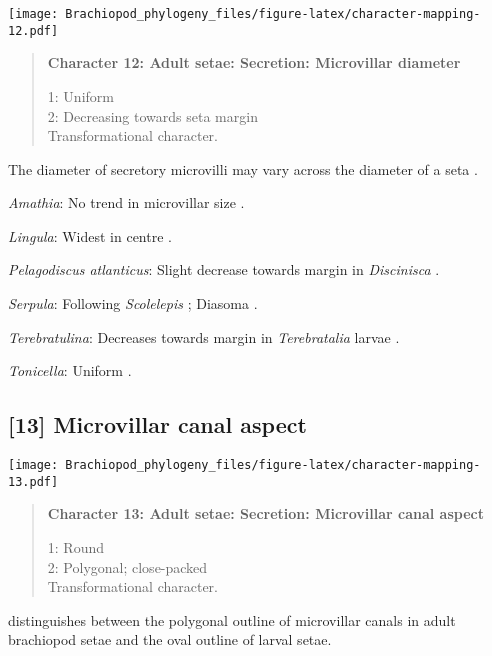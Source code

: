 \documentclass[openany]{book}
\theoremstyle{definition}
\theoremstyle{definition}
\theoremstyle{definition}
\theoremstyle{remark}
\begin{document}
\texttt{[image: Brachiopod\_phylogeny\_files/figure-latex/character-mapping-12.pdf]}

\begin{quote}
\textbf{Character 12: Adult setae: Secretion: Microvillar diameter}

1: Uniform\\
2: Decreasing towards seta margin\\
Transformational character.
\end{quote}

The diameter of secretory microvilli may vary across the diameter of a
seta \citep{Smith2014}.

\hypertarget{Amathia-coding-12}{}
\emph{Amathia}: No trend in microvillar size \citep{Gordon1975}.

\hypertarget{Lingula-coding-12}{}
\emph{Lingula}: Widest in centre \citep{Luter2000}.

\hypertarget{Pelagodiscus_atlanticus-coding-12}{}
\emph{Pelagodiscus atlanticus}: Slight decrease towards margin in
\emph{Discinisca} \citep{Luter2003}.

\hypertarget{Serpula-coding-12}{}
\emph{Serpula}: Following \emph{Scolelepis} \citep{Hausen2005}; Diasoma
\citep{Orrhage1971}.

\hypertarget{Terebratulina-coding-12}{}
\emph{Terebratulina}: Decreases towards margin in \emph{Terebratalia}
larvae \citep{Gustus1972}.

\hypertarget{Tonicella-coding-12}{}
\emph{Tonicella}: Uniform \citep{Fischer1980, Leise1982}.

\subsection*{{[}13{]} Microvillar canal
aspect}\label{microvillar-canal-aspect}

\texttt{[image: Brachiopod\_phylogeny\_files/figure-latex/character-mapping-13.pdf]}

\begin{quote}
\textbf{Character 13: Adult setae: Secretion: Microvillar canal aspect}

1: Round\\
2: Polygonal; close-packed\\
Transformational character.
\end{quote}

\citet{Luter2000} distinguishes between the polygonal outline of
microvillar canals in adult brachiopod setae and the oval outline of
larval setae.
\end{document}
